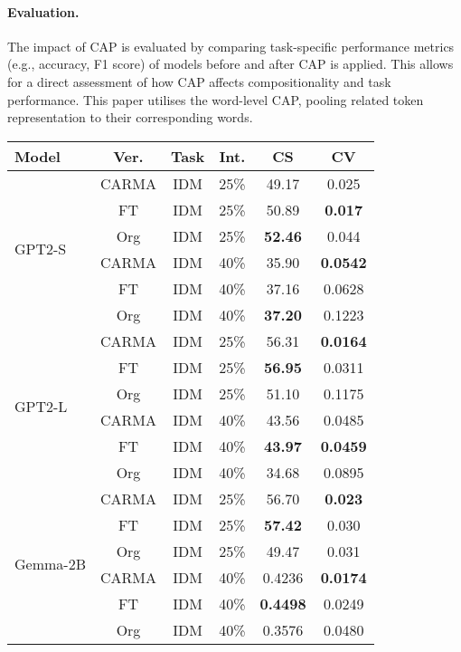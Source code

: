 \paragraph{Evaluation.} The impact of CAP is evaluated by comparing task-specific performance metrics (e.g., accuracy, F1 score) of models before and after CAP is applied. This allows for a direct assessment of how CAP affects compositionality and task performance. This paper utilises the word-level CAP, pooling related token representation to their corresponding words. 
\begin{table}[h]
\centering
\small
\begin{tabular}{|l|c|c|c|c|c|}
\hline
\textbf{Model} & \textbf{Ver.} & \textbf{Task} & \textbf{Int.} & \textbf{CS} & \textbf{CV} \\
\hline
\multirow{6}{*}{GPT2-S} 
& CARMA & IDM & 25\% & 49.17 & 0.025 \\
& FT & IDM & 25\% & 50.89 & \textbf{0.017} \\
& Org & IDM & 25\% & \textbf{52.46} & 0.044 \\
\cline{2-6}
& CARMA & IDM & 40\% & 35.90 & \textbf{0.0542 }\\
& FT & IDM & 40\% & 37.16 & 0.0628 \\
& Org & IDM & 40\% & \textbf{37.20} & 0.1223 \\
\hline


\multirow{6}{*}{GPT2-L} 
& CARMA & IDM & 25\% & 56.31 & \textbf{0.0164} \\
& FT & IDM & 25\% & \textbf{56.95} & 0.0311 \\
& Org & IDM & 25\% & 51.10 & 0.1175 \\
\cline{2-6}
& CARMA & IDM & 40\% & 43.56 & {0.0485} \\
& FT & IDM & 40\% & \textbf{43.97} & \textbf{0.0459} \\
& Org & IDM & 40\% & 34.68  & 0.0895 \\
\hline


\multirow{6}{*}{Gemma-2B} 
& CARMA & IDM & 25\% & 56.70 & \textbf{0.023} \\
& FT & IDM & 25\% & \textbf{57.42} & 0.030 \\
& Org & IDM & 25\% & 49.47 & 0.031 \\
\cline{2-6}
& CARMA & IDM & 40\% & 0.4236 & \textbf{0.0174} \\
& FT & IDM & 40\% & \textbf{0.4498} & 0.0249 \\
& Org & IDM & 40\% & 0.3576 & 0.0480 \\
\hline


\end{tabular}
\end{table}
